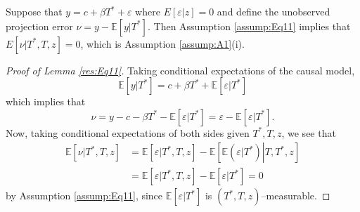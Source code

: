 \begin{lem}
  \label{res:Eq11}
  Suppose that $y = c + \beta T^* + \varepsilon$ where $E[\varepsilon|z]=0$ and define the unobserved projection error $\nu = y - \mathbb{E}[y|T^*]$.
  Then Assumption \ref{assump:Eq11} implies that $E[\nu|T^*,T,z]=0$, which is Assumption \ref{assump:A1}(i).
\end{lem}
\begin{proof}[Proof of Lemma \ref{res:Eq11}]
  Taking conditional expectations of the causal model,
  \[\mathbb{E}[y|T^*] = c + \beta T^* + \mathbb{E}[\varepsilon|T^*]\]
  which implies that 
  \[\nu = y - c - \beta T^* - \mathbb{E}[\varepsilon|T^*] = \varepsilon - \mathbb{E}[\varepsilon|T^*].\]
  Now, taking conditional expectations of both sides given $T^*,T,z$, we see that 
  \begin{align*}
  \mathbb{E}[\nu|T^*,T,z]&= \mathbb{E}[\varepsilon|T^*,T,z] - \mathbb{E}\left[ \mathbb{E}\left( \left.\varepsilon\right|T^* \right)\left. \right| T,T^*,z \right]\\
  &= \mathbb{E}[\varepsilon|T^*,T,z] - \mathbb{E}\left[ \left.\varepsilon\right|T^* \right] = 0
\end{align*}
by Assumption \ref{assump:Eq11}, since $\mathbb{E}[\varepsilon|T^*]$ is $(T^*,T,z)$--measurable.
\end{proof}

